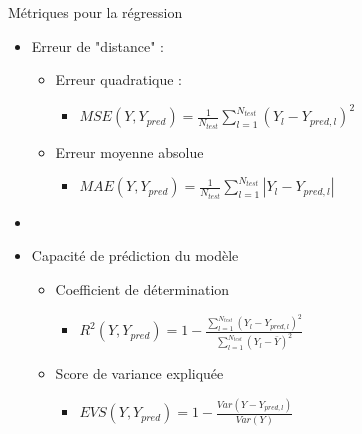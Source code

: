 \documentclass{beamer}
\begin{document}
\begin{frame}{Métriques pour la régression}
  \begin{itemize}
    \item Erreur de "distance" :
    \begin{itemize}
      \item Erreur quadratique :
      \begin{itemize}
        \item $MSE(Y,Y_{pred}) = \frac{1}{N_{test}} \sum_{l=1}^{N_{test}} {(Y_l - Y_{pred,l})}^2$
      \end{itemize}
      \item Erreur moyenne absolue
      \begin{itemize}
        \item $MAE(Y,Y_{pred}) = \frac{1}{N_{test}} \sum_{l=1}^{N_{test}} |Y_l - Y_{pred,l}|$
      \end{itemize}
    \end{itemize}
    \item[]
    \item Capacité de prédiction du modèle
    \begin{itemize}
      \item Coefficient de détermination
      \begin{itemize}
        \item $R^2(Y,Y_{pred}) = 1 - \frac{\sum_{l=1}^{N_{test}} (Y_l - Y_{pred,l})^2}{\sum_{l=1}^{N_{test}} (Y_l - \bar{Y})^2}$
      \end{itemize}
      \item Score de variance expliquée
      \begin{itemize}
        \item $EVS(Y,Y_{pred}) = 1 - \frac{Var(Y - Y_{pred,l})}{Var(Y)}$
      \end{itemize}
    \end{itemize}
  \end{itemize}
\end{frame}
\end{document}
